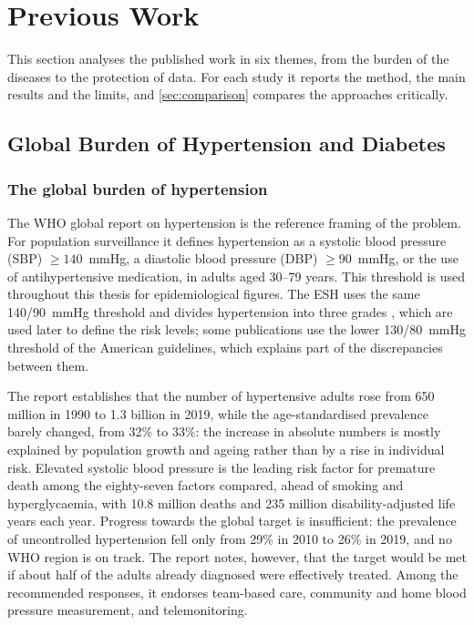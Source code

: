 \section{Previous Work}\label{sec:previous-work}

This section analyses the published work in six themes, from the burden of the diseases to the protection of data. For each study it reports the method, the main results and the limits, and \cref{sec:comparison} compares the approaches critically.

\subsection{Global Burden of Hypertension and Diabetes}\label{sec:burden}\label{sec:transition}\label{sec:hta-burden}

\subsubsection{The global burden of hypertension}

The WHO global report on hypertension \parencite{who2023hypertension} is the reference framing of the problem. For population surveillance it defines hypertension as a systolic blood pressure (SBP) $\geq 140$~mmHg, a diastolic blood pressure (DBP) $\geq 90$~mmHg, or the use of antihypertensive medication, in adults aged 30--79 years. This threshold is used throughout this thesis for epidemiological figures. The ESH uses the same 140/90~mmHg threshold and divides hypertension into three grades \parencite{mancia2023}, which are used later to define the risk levels; some publications use the lower 130/80~mmHg threshold of the American guidelines, which explains part of the discrepancies between them.

The report establishes that the number of hypertensive adults rose from 650 million in 1990 to 1.3 billion in 2019, while the age-standardised prevalence barely changed, from 32\% to 33\%: the increase in absolute numbers is mostly explained by population growth and ageing rather than by a rise in individual risk. Elevated systolic blood pressure is the leading risk factor for premature death among the eighty-seven factors compared, ahead of smoking and hyperglycaemia, with 10.8 million deaths and 235 million disability-adjusted life years each year. Progress towards the global target is insufficient: the prevalence of uncontrolled hypertension fell only from 29\% in 2010 to 26\% in 2019, and no WHO region is on track. The report notes, however, that the target would be met if about half of the adults already diagnosed were effectively treated. Among the recommended responses, it endorses team-based care, community and home blood pressure measurement, and telemonitoring.

